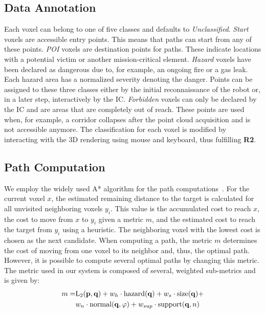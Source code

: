 \documentclass{egpubl}
\begin{document}
\subsection{Data Annotation} \label{sec:overview:annotation}
Each voxel can belong to one of five classes and defaults to \emph{Unclassified}. \emph{Start} voxels are accessible entry points. This means that paths can start from any of these points. \emph{POI} voxels are destination points for paths. These indicate locations with a potential victim or another mission-critical element. \emph{Hazard} voxels have been declared as dangerous due to, for example, an ongoing fire or a gas leak. Each hazard area has a normalized severity denoting the danger. Points can be assigned to these three classes either by the initial reconnaissance of the robot or, in a later step, interactively by the IC. \emph{Forbidden} voxels can only be declared by the IC and are areas that are completely out of reach. These points are used when, for example, a corridor collapses after the point cloud acquisition and is not accessible anymore. The classification for each voxel is modified by interacting with the 3D rendering using mouse and keyboard, thus fulfilling {\bfseries R2}. 

\subsection{Path Computation} \label{sec:overview:pathcomputation}
We employ the widely used A* algorithm for the path computations~\cite{4082128}. For the current voxel $x$, the estimated remaining distance to the target is calculated for all unvisited neighboring voxels $y_i$. This value is the accumulated cost to reach $x$, the cost to move from $x$ to $y_i$ given a metric $m$, and the estimated cost to reach the target from $y_i$ using a heuristic. The neighboring voxel with the lowest cost is chosen as the next candidate. When computing a path, the metric $m$ determines the cost of moving from one voxel to its neighbor and, thus, the optimal path. However, it is possible to compute several optimal paths by changing this metric. The metric used in our system is composed of several, weighted sub-metrics and is given by:
%
\begin{equation}
\begin{array}{r@{}l}
m = & \textrm{L}_2(\mathbf{p},\mathbf{q}) + w_h \cdot \textrm{hazard}(\mathbf{q}) + w_s \cdot \textrm{size}(\mathbf{q}) + \vspace*{0.1cm} \\
  & w_n \cdot \textrm{normal}(\mathbf{q},\varphi) + w_{sup} \cdot \textrm{support}(\mathbf{q},n)
\end{array}
\label{eqn:metric}
\end{equation}
\end{document}
